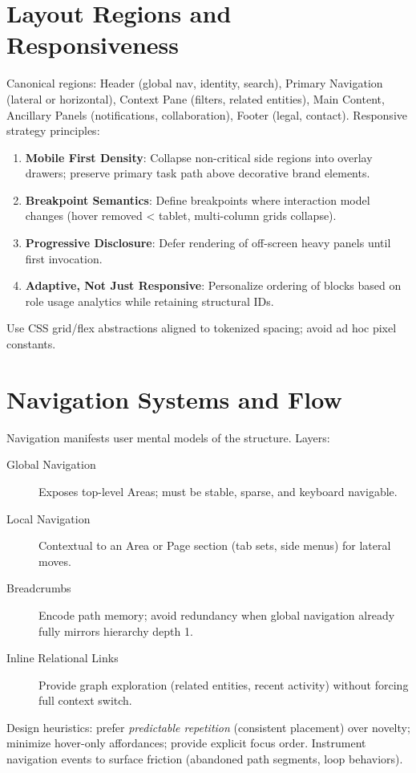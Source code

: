 \section{Layout Regions and Responsiveness}
Canonical regions: Header (global nav, identity, search), Primary Navigation (lateral or horizontal), Context Pane (filters, related entities), Main Content, Ancillary Panels (notifications, collaboration), Footer (legal, contact). Responsive strategy principles:
\begin{enumerate}
	\item \textbf{Mobile First Density}: Collapse non-critical side regions into overlay drawers; preserve primary task path above decorative brand elements.
	\item \textbf{Breakpoint Semantics}: Define breakpoints where interaction model changes (hover removed < tablet, multi-column grids collapse).
	\item \textbf{Progressive Disclosure}: Defer rendering of off-screen heavy panels until first invocation.
	\item \textbf{Adaptive, Not Just Responsive}: Personalize ordering of blocks based on role usage analytics while retaining structural IDs.
\end{enumerate}
Use CSS grid/flex abstractions aligned to tokenized spacing; avoid ad hoc pixel constants.

\section{Navigation Systems and Flow}
Navigation manifests user mental models of the structure. Layers:
\begin{description}
	\item[Global Navigation] Exposes top-level Areas; must be stable, sparse, and keyboard navigable.
	\item[Local Navigation] Contextual to an Area or Page section (tab sets, side menus) for lateral moves.
	\item[Breadcrumbs] Encode path memory; avoid redundancy when global navigation already fully mirrors hierarchy depth 1.
	\item[Inline Relational Links] Provide graph exploration (related entities, recent activity) without forcing full context switch.
\end{description}
Design heuristics: prefer \textit{predictable repetition} (consistent placement) over novelty; minimize hover-only affordances; provide explicit focus order. Instrument navigation events to surface friction (abandoned path segments, loop behaviors).

